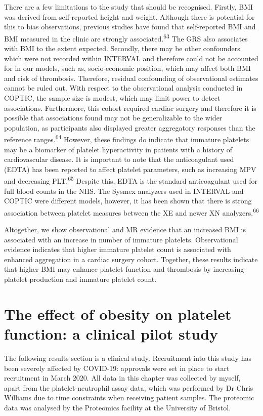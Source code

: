 \documentclass[11pt,twoside]{bristolthesis}
\begin{document}
There are a few limitations to the study that should be recognised. Firstly, BMI was derived from self-reported height and weight. Although there is potential for this to bias observations, previous studies have found that self-reported BMI and BMI measured in the clinic are strongly associated.\textsuperscript{63} The GRS also associates with BMI to the extent expected. Secondly, there may be other confounders which were not recorded within INTERVAL and therefore could not be accounted for in our models, such as, socio-economic position, which may affect both BMI and risk of thrombosis. Therefore, residual confounding of observational estimates cannot be ruled out. With respect to the observational analysis conducted in COPTIC, the sample size is modest, which may limit power to detect associations. Furthermore, this cohort required cardiac surgery and therefore it is possible that associations found may not be generalizable to the wider population, as participants also displayed greater aggregatory responses than the reference ranges.\textsuperscript{64} However, these findings do indicate that immature platelets may be a biomarker of platelet hyperactivity in patients with a history of cardiovascular disease. It is important to note that the anticoagulant used (EDTA) has been reported to affect platelet parameters, such as increasing MPV and decreasing PLT.\textsuperscript{65} Despite this, EDTA is the standard anticoagulant used for full blood counts in the NHS. The Sysmex analyzers used in INTERVAL and COPTIC were different models, however, it has been shown that there is strong association between platelet measures between the XE and newer XN analyzers.\textsuperscript{66}

Altogether, we show observational and MR evidence that an increased BMI is associated with an increase in number of immature platelets. Observational evidence indicates that higher immature platelet count is associated with enhanced aggregation in a cardiac surgery cohort. Together, these results indicate that higher BMI may enhance platelet function and thrombosis by increasing platelet production and immature platelet count.

\hypertarget{BMI-platelets-clinic}{%
\chapter{The effect of obesity on platelet function: a clinical pilot study}\label{BMI-platelets-clinic}}

The following results section is a clinical study. Recruitment into this study has been severely affected by COVID-19: approvals were set in place to start recruitment in March 2020. All data in this chapter was collected by myself, apart from the platelet-neutrophil assay data, which was performed by Dr Chris Williams due to time constraints when receiving patient samples. The proteomic data was analysed by the Proteomics facility at the University of Bristol.
\end{document}
